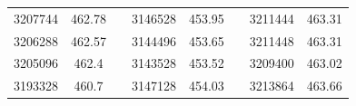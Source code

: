 \documentclass[12pt]{mwart}
\begin{document}
\begin{table}[H]
\begin{tabular}{cclcclcc}
		3207744                                                  & 462.78                                                        &  & 3146528                                                  & 453.95                                                        &  & 3211444                                                  & 463.31                                                        \\
		3206288                                                  & 462.57                                                        &  & 3144496                                                  & 453.65                                                        &  & 3211448                                                  & 463.31                                                        \\
		3205096                                                  & 462.4                                                         &  & 3143528                                                  & 453.52                                                        &  & 3209400                                                  & 463.02                                                        \\
		3193328                                                  & 460.7                                                         &  & 3147128                                                  & 454.03                                                        &  & 3213864                                                  & 463.66                                                       
	\end{tabular}
	\end{table}
\end{document}
